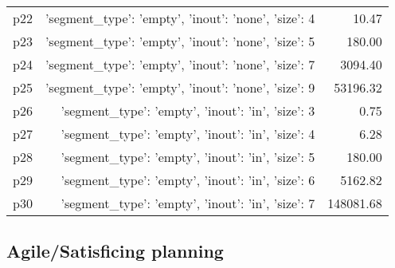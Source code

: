 \documentclass{article}
\begin{document}
\begin{center}
\begin{tabular}{@{}l|r|r@{}}
  p22&{'segment\_type': 'empty', 'inout': 'none', 'size': 4}&10.47\\
  p23&{'segment\_type': 'empty', 'inout': 'none', 'size': 5}&180.00\\
  p24&{'segment\_type': 'empty', 'inout': 'none', 'size': 7}&3094.40\\
  p25&{'segment\_type': 'empty', 'inout': 'none', 'size': 9}&53196.32\\
  p26&{'segment\_type': 'empty', 'inout': 'in', 'size': 3}&0.75\\
  p27&{'segment\_type': 'empty', 'inout': 'in', 'size': 4}&6.28\\
  p28&{'segment\_type': 'empty', 'inout': 'in', 'size': 5}&180.00\\
  p29&{'segment\_type': 'empty', 'inout': 'in', 'size': 6}&5162.82\\
  p30&{'segment\_type': 'empty', 'inout': 'in', 'size': 7}&148081.68
                            \end{tabular}
                            \end{center}
                    

                                \subsection*{Agile/Satisficing planning}
                                
\end{document}
